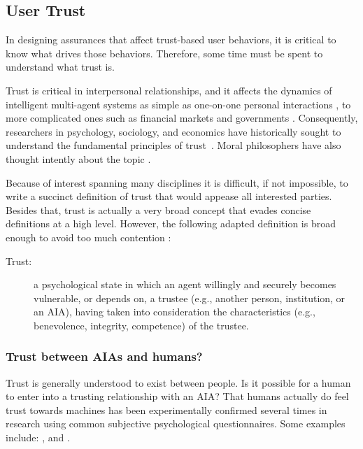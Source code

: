 \subsection{User Trust} \label{sec:trust}
    In designing assurances that affect trust-based user behaviors, it is critical to know what drives those behaviors. Therefore, some time must be spent to understand what trust is. 

    Trust is critical in interpersonal relationships, and it affects the dynamics of intelligent multi-agent systems as simple as one-on-one personal interactions  \cite{Lewicki2006-hj}, to more complicated ones such as financial markets and governments \cite{Fukuyama1995-un}. Consequently, researchers in psychology, sociology, and economics have historically sought to understand the fundamental principles of trust~\cite{Gambetta1988-pi}. Moral philosophers have also thought intently about the topic \cite{Baier1986-im}.

    Because of interest spanning many disciplines it is difficult, if not impossible, to write a succinct definition of trust that would appease all interested parties. Besides that, trust is actually a very broad concept that evades concise definitions at a high level. However, the following adapted definition is broad enough to avoid too much contention \cite{McKnight2004-vv}:

    \begin{description}
        \item [Trust:] a psychological state in which an agent willingly and securely becomes vulnerable, or depends on, a trustee (e.g., another person, institution, or an AIA), having taken into consideration the characteristics (e.g., benevolence, integrity, competence) of the trustee.
    \end{description}

    \subsubsection{Trust between AIAs and humans?}
        Trust is generally understood to exist between people. Is it possible for a human to enter into a trusting relationship with an AIA? That humans actually do feel trust towards machines has been experimentally confirmed several times in research using common subjective psychological questionnaires. Some examples include: \citet{Muir1996-gt,Reeves1997-ad,Groom2007-bz,Mcknight2011-gv,Riley1996-qm,Bainbridge2011-pl,Kaniarasu2012-mo,Salem2015-md,Desai2012-rc, Freedy2007-sg, Inagaki1998-cl, Kaniarasu2013-ho}, and \citet{Wang2016-id}.

